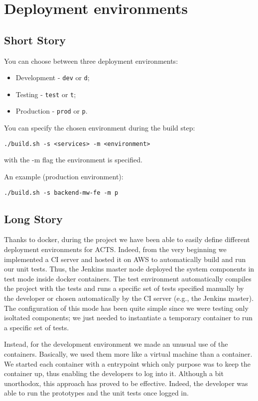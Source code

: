 
\section{Deployment environments}

\subsection{Short Story}

You can choose between three deployment environments:

\begin{itemize}
\item Development - \texttt{dev} or \texttt{d};
\item Testing - \texttt{test} or \texttt{t};
\item Production - \texttt{prod} or \texttt{p}.
\end{itemize}

You can specify the chosen environment during the build step:

\begin{lstlisting}
./build.sh -s <services> -m <environment>
\end{lstlisting}

with the -m flag the environment is specified.


An example (production environment):

\begin{lstlisting}
./build.sh -s backend-mw-fe -m p
\end{lstlisting}

\subsection{Long Story}
Thanks to docker, during the project we have been able to easily define different
deployment environments for ACTS. Indeed, from the very beginning we implemented a CI server and hosted it
on AWS to automatically build and run our unit tests. Thus, the Jenkins master node deployed the
system components in test mode inside docker containers.
The test environment automatically compiles the project with the tests and
runs a specific set of tests specified manually by the developer or chosen automatically by
the CI server (e.g., the Jenkins master). The configuration of this mode has been quite simple
since we were testing only isoltated components;
we just needed to instantiate a temporary
container to run a specific set of tests.


Instead, for the development environment we made an unusual use of the containers. Basically, we
used them more like a virtual machine than a container.
We started each container with a entrypoint which
only purpose was to keep the container up, thus enabling the developers to log into it.
Although a bit unorthodox, this approach has proved to be effective. Indeed, the developer
was able to run the prototypes and the unit tests once logged in.


